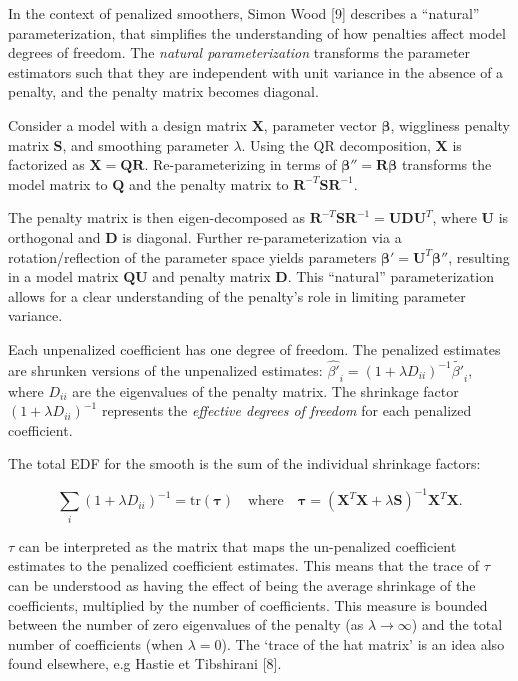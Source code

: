 \documentclass[
11pt, %
oneside, %
english, %
singlespacing, %
]{macthesis} %
\begin{document}
In the context of penalized smoothers, Simon Wood {[}9{]} describes a ``natural'' parameterization, that simplifies the understanding of how penalties affect model degrees of freedom. The \emph{natural parameterization} transforms the parameter estimators such that they are independent with unit variance in the absence of a penalty, and the penalty matrix becomes diagonal.

Consider a model with a design matrix \(\mathbf{X}\), parameter vector \(\boldsymbol{\beta}\), wiggliness penalty matrix \(\mathbf{S}\), and smoothing parameter \(\lambda\). Using the QR decomposition, \(\mathbf{X}\) is factorized as \(\mathbf{X} = \mathbf{Q} \mathbf{R}\). Re-parameterizing in terms of \(\boldsymbol{\beta''} = \mathbf{R} \boldsymbol{\beta}\) transforms the model matrix to \(\mathbf{Q}\) and the penalty matrix to \(\mathbf{R}^{-T} \mathbf{S} \mathbf{R}^{-1}\).

The penalty matrix is then eigen-decomposed as \(\mathbf{R}^{-T} \mathbf{S} \mathbf{R}^{-1} = \mathbf{U} \mathbf{D} \mathbf{U}^T\), where \(\mathbf{U}\) is orthogonal and \(\mathbf{D}\) is diagonal. Further re-parameterization via a rotation/reflection of the parameter space yields parameters \(\boldsymbol{\beta'} = \mathbf{U}^T \boldsymbol{\beta''}\), resulting in a model matrix \(\mathbf{Q} \mathbf{U}\) and penalty matrix \(\mathbf{D}\). This ``natural'' parameterization allows for a clear understanding of the penalty's role in limiting parameter variance.

Each unpenalized coefficient has one degree of freedom. The penalized estimates are shrunken versions of the unpenalized estimates: \(\hat{\beta'}_i = (1 + \lambda D_{ii})^{-1} \tilde{\beta'}_i\), where \(D_{ii}\) are the eigenvalues of the penalty matrix. The shrinkage factor \((1 + \lambda D_{ii})^{-1}\) represents the \emph{effective degrees of freedom} for each penalized coefficient.

The total EDF for the smooth is the sum of the individual shrinkage factors:

\[
\sum_i (1 + \lambda D_{ii})^{-1} = \text{tr}(\mathbf{\tau}) \quad \text{where} \quad \mathbf{\tau} = (\mathbf{X}^T \mathbf{X} + \lambda \mathbf{S})^{-1} \mathbf{X}^T \mathbf{X}.
\]

\(\tau\) can be interpreted as the matrix that maps the un-penalized coefficient estimates to the penalized coefficient estimates. This means that the trace of \(\tau\) can be understood as having the effect of being the average shrinkage of the coefficients, multiplied by the number of coefficients. This measure is bounded between the number of zero eigenvalues of the penalty (as \(\lambda \to \infty\)) and the total number of coefficients (when \(\lambda = 0\)). The `trace of the hat matrix' is an idea also found elsewhere, e.g Hastie et Tibshirani {[}8{]}.
\end{document}
